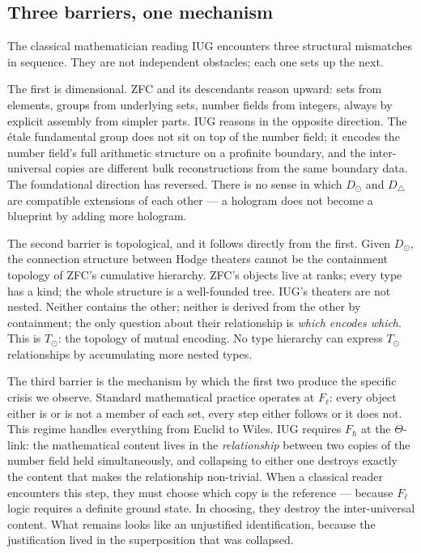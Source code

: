 \documentclass[12pt]{article}
\theoremstyle{plain}
\theoremstyle{definition}
\theoremstyle{remark}
\begin{document}
\subsection{Three barriers, one mechanism}
\label{subsec:barriers}

The classical mathematician reading IUG encounters three structural mismatches in sequence.
They are not independent obstacles; each one sets up the next.

The first is dimensional. ZFC and its descendants reason upward: sets from elements, groups
from underlying sets, number fields from integers, always by explicit assembly from simpler
parts. IUG reasons in the opposite direction. The \'etale fundamental group does not sit on
top of the number field; it encodes the number field's full arithmetic structure on a profinite
boundary, and the inter-universal copies are different bulk reconstructions from the same
boundary data. The foundational direction has reversed. There is no sense in which
$D_\odot$ and $D_\triangle$ are compatible extensions of each other --- a hologram does not
become a blueprint by adding more hologram.

The second barrier is topological, and it follows directly from the first. Given $D_\odot$,
the connection structure between Hodge theaters cannot be the containment topology of ZFC's
cumulative hierarchy. ZFC's objects live at ranks; every type has a kind; the whole structure
is a well-founded tree. IUG's theaters are not nested. Neither contains the other; neither
is derived from the other by containment; the only question about their relationship is
\emph{which encodes which}. This is $T_\odot$: the topology of mutual encoding. No type
hierarchy can express $T_\odot$ relationships by accumulating more nested types.

The third barrier is the mechanism by which the first two produce the specific crisis we observe.
Standard mathematical practice operates at $F_\ell$: every object either is or is not a member
of each set, every step either follows or it does not. This regime handles everything from
Euclid to Wiles. IUG requires $F_\hbar$ at the $\Theta$-link: the mathematical content lives
in the \emph{relationship} between two copies of the number field held simultaneously, and
collapsing to either one destroys exactly the content that makes the relationship non-trivial.
When a classical reader encounters this step, they must choose which copy is the reference ---
because $F_\ell$ logic requires a definite ground state. In choosing, they destroy the
inter-universal content. What remains looks like an unjustified identification, because
the justification lived in the superposition that was collapsed.
\end{document}
